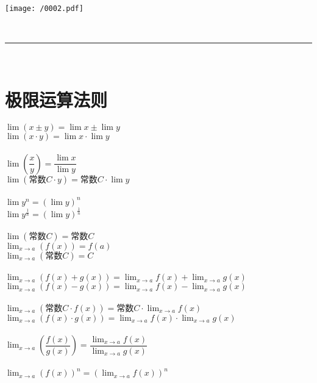 \documentclass[UTF8]{ctexart}
\begin{document}
\texttt{[image: /0002.pdf]}

~\\
\hrule
~\\




\part{极限运算法则}

$ \lim (x \pm y) = \lim x \pm \lim y $ \\
$ \lim (x \cdot y) = \lim x \cdot \lim y $  \\
\\
$ \lim (\dfrac{x} {y}) = \dfrac{\lim x} {\lim y} $ \\
$ \lim (\text{常数} C \cdot y) = \text{常数} C \cdot \lim y $ \\
\\
$ \lim y^n = (\lim y)^n $ \\
$ \lim y^{\frac{1} {n}} = (\lim y)^{\frac{1} {n}} $ \\
\\
$ \lim(\text{常数}C) = \text{常数}C $
\\

$\lim_{x\rightarrow a}\left( f\left( x \right) \right) =f\left( a \right) $ \\
$\lim_{x\rightarrow a}\left( \text{常数}C \right) =C$ \\
\\
$ \lim_{x\rightarrow a}\left( f\left( x \right) +g\left( x \right) \right) =\lim_{x\rightarrow a}f\left( x \right) +\lim_{x\rightarrow a}g\left( x \right) $ \\
$\lim_{x\rightarrow a}\left( f\left( x \right) -g\left( x \right) \right) =\lim_{x\rightarrow a}f\left( x \right) -\lim_{x\rightarrow a}g\left( x \right) $ \\
\\
$\lim_{x\rightarrow a}\left( \text{常数}C\cdot f\left( x \right) \right) =\text{常数}C\cdot \lim_{x\rightarrow a}f\left( x \right) $ \\
$\lim_{x\rightarrow a}\left( f\left( x \right) \cdot g\left( x \right) \right) =\lim_{x\rightarrow a}f\left( x \right) \cdot \lim_{x\rightarrow a}g\left( x \right) $ \\
\\
$\lim_{x\rightarrow a}\left( \dfrac{f\left( x \right)}{g\left( x \right)} \right) =\dfrac{\lim_{x\rightarrow a}f\left( x \right)}{\lim_{x\rightarrow a}g\left( x \right)}$ \\
\\
$\lim_{x\rightarrow a}\left( f\left( x \right) \right) ^n=\left( \lim_{x\rightarrow a}f\left( x \right) \right) ^n$ 
\end{document}
